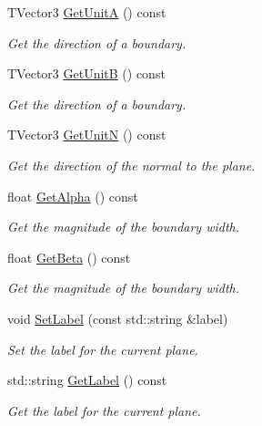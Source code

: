 \begin{DoxyCompactItemize}
T\-Vector3 \hyperlink{classcalib_1_1Plane_ad148c0cf52a30b07f1467ca143be9497}{Get\-Unit\-A} () const 
\begin{DoxyCompactList}\small\item\em Get the direction of a boundary. \end{DoxyCompactList}\item 
T\-Vector3 \hyperlink{classcalib_1_1Plane_a9f15b0528238dceb553463727402537d}{Get\-Unit\-B} () const 
\begin{DoxyCompactList}\small\item\em Get the direction of a boundary. \end{DoxyCompactList}\item 
T\-Vector3 \hyperlink{classcalib_1_1Plane_a90545891fdcacd17a11dc49bf67a7305}{Get\-Unit\-N} () const 
\begin{DoxyCompactList}\small\item\em Get the direction of the normal to the plane. \end{DoxyCompactList}\item 
float \hyperlink{classcalib_1_1Plane_a81ab693d29f1090b001bbfdcda1c3dfd}{Get\-Alpha} () const 
\begin{DoxyCompactList}\small\item\em Get the magnitude of the boundary width. \end{DoxyCompactList}\item 
float \hyperlink{classcalib_1_1Plane_ab20c955965d393d0deb596cea9950134}{Get\-Beta} () const 
\begin{DoxyCompactList}\small\item\em Get the magnitude of the boundary width. \end{DoxyCompactList}\item 
void \hyperlink{classcalib_1_1Plane_aa34717e7d8c88067c5b9c403d8debb7a}{Set\-Label} (const std\-::string \&label)
\begin{DoxyCompactList}\small\item\em Set the label for the current plane. \end{DoxyCompactList}\item 
std\-::string \hyperlink{classcalib_1_1Plane_adbc591dfae1513a6660c50d167cd0047}{Get\-Label} () const 
\begin{DoxyCompactList}\small\item\em Get the label for the current plane. \end{DoxyCompactList}\end{DoxyCompactItemize}
